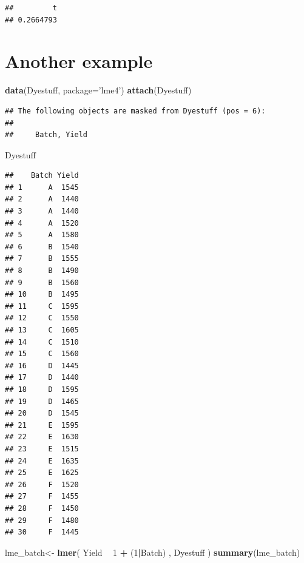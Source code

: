 \documentclass[]{book}
\newenvironment{Shaded}{\begin{snugshade}}{\end{snugshade}}
\newcommand{\KeywordTok}[1]{\textcolor[rgb]{0.13,0.29,0.53}{\textbf{#1}}}
\newcommand{\DataTypeTok}[1]{\textcolor[rgb]{0.13,0.29,0.53}{#1}}
\newcommand{\DecValTok}[1]{\textcolor[rgb]{0.00,0.00,0.81}{#1}}
\newcommand{\StringTok}[1]{\textcolor[rgb]{0.31,0.60,0.02}{#1}}
\newcommand{\OperatorTok}[1]{\textcolor[rgb]{0.81,0.36,0.00}{\textbf{#1}}}
\newcommand{\NormalTok}[1]{#1}
\begin{document}
\begin{Shaded}
\end{Shaded}

\begin{verbatim}
##         t 
## 0.2664793
\end{verbatim}

\section{Another example}\label{another-example}

\begin{Shaded}
\begin{Highlighting}[]
\KeywordTok{data}\NormalTok{(Dyestuff, }\DataTypeTok{package=}\StringTok{'lme4'}\NormalTok{)}
\KeywordTok{attach}\NormalTok{(Dyestuff)}
\end{Highlighting}
\end{Shaded}

\begin{verbatim}
## The following objects are masked from Dyestuff (pos = 6):
## 
##     Batch, Yield
\end{verbatim}

\begin{Shaded}
\begin{Highlighting}[]
\NormalTok{Dyestuff}
\end{Highlighting}
\end{Shaded}

\begin{verbatim}
##    Batch Yield
## 1      A  1545
## 2      A  1440
## 3      A  1440
## 4      A  1520
## 5      A  1580
## 6      B  1540
## 7      B  1555
## 8      B  1490
## 9      B  1560
## 10     B  1495
## 11     C  1595
## 12     C  1550
## 13     C  1605
## 14     C  1510
## 15     C  1560
## 16     D  1445
## 17     D  1440
## 18     D  1595
## 19     D  1465
## 20     D  1545
## 21     E  1595
## 22     E  1630
## 23     E  1515
## 24     E  1635
## 25     E  1625
## 26     F  1520
## 27     F  1455
## 28     F  1450
## 29     F  1480
## 30     F  1445
\end{verbatim}

\begin{Shaded}
\begin{Highlighting}[]
\NormalTok{lme_batch<-}\StringTok{ }\KeywordTok{lmer}\NormalTok{( Yield }\OperatorTok{~}\StringTok{ }\DecValTok{1} \OperatorTok{+}\StringTok{ }\NormalTok{(}\DecValTok{1}\OperatorTok{|}\NormalTok{Batch)  , Dyestuff )}
\KeywordTok{summary}\NormalTok{(lme_batch)}
\end{Highlighting}
\end{Shaded}
\end{document}
